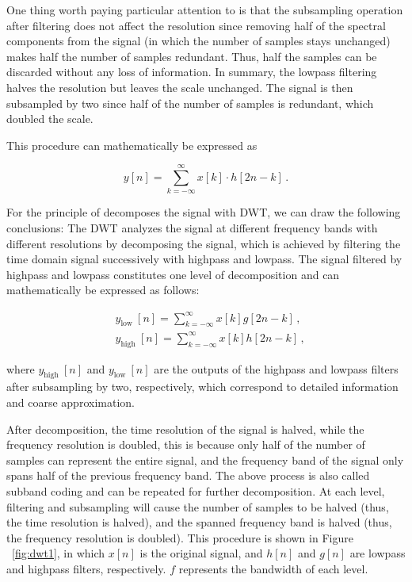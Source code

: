 One thing worth paying particular attention to is that the subsampling operation after filtering does not affect the resolution since removing half of the spectral components from the signal (in which the number of samples stays unchanged) makes half the number of samples redundant. Thus, half the samples can be discarded without any loss of information. In summary, the lowpass filtering halves the resolution but leaves the scale unchanged. The signal is then subsampled by two since half of the number of samples is redundant, which doubled the scale.

This procedure can mathematically be expressed as

\begin{equation}
y[n]=\sum_{k=-\infty}^{\infty} x[k] \cdot h[2 n-k]\,.
\label{equ:subband}
\end{equation}

For the principle of decomposes the signal with DWT, we can draw the following conclusions: The DWT analyzes the signal at different frequency bands with different resolutions by decomposing the signal, which is achieved by filtering the time domain signal successively with highpass and lowpass. The signal filtered by highpass and lowpass constitutes one level of decomposition and can
mathematically be expressed as follows:

\begin{equation}
\begin{aligned}
&y_{\text {low }}[n]=\sum_{k=-\infty}^{\infty} x[k] g[2 n-k]\,, \\
&y_{\text {high }}[n]=\sum_{k=-\infty}^{\infty} x[k] h[2 n-k]\,,
\end{aligned}
\end{equation}

where $y_{\text {high }}[n]$ and $y_{\text {low }}[n]$ are the outputs of the highpass and lowpass filters after subsampling by two, respectively, which correspond to detailed information and coarse approximation.

After decomposition, the time resolution of the signal is halved, while the frequency resolution is doubled, this is because only half of the number of samples can represent the entire signal, and the frequency band of the signal only spans half of the previous frequency band. The above process is also called subband coding and can be repeated for further decomposition. At each level, filtering and subsampling will cause the number of samples to be halved (thus, the time resolution is halved), and the spanned frequency band is halved (thus, the frequency resolution is doubled). This procedure is shown in Figure ~\ref{fig:dwt1}, in which $x[n]$ is the original signal, and $h[n]$ and $g[n]$ are lowpass and highpass filters, respectively. $f$ represents the bandwidth of each level. 

